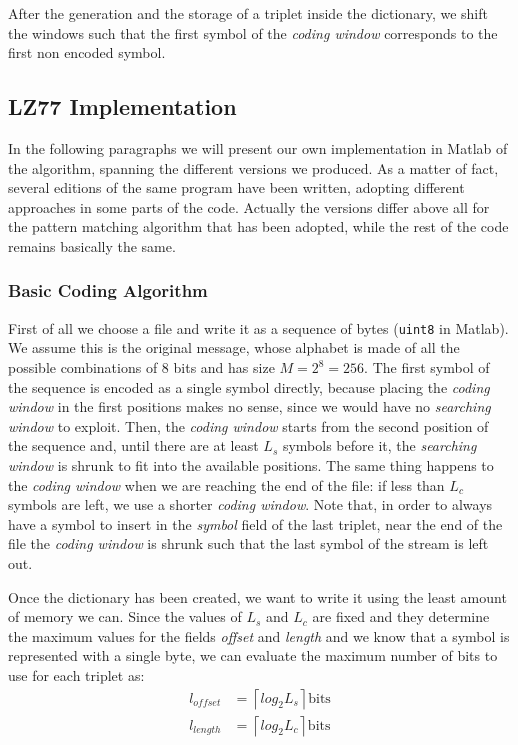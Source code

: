 After the generation and the storage of a triplet inside the dictionary, we shift the windows such that the first symbol of the \textit{coding window} corresponds to the first non encoded symbol.

\subsection{LZ77 Implementation} \label{subsec:lz77implem}
In the following paragraphs we will present our own implementation in Matlab of the algorithm, spanning the different versions we produced. As a matter of fact, several editions of the same program have been written, adopting different approaches in some parts of the code. Actually the versions differ above all for the pattern matching algorithm that has been adopted, while the rest of the code remains basically the same.

\subsubsection{Basic Coding Algorithm} \label{subsubsec:basiclz77}
First of all we choose a file and write it as a sequence of bytes (\texttt{uint8} in Matlab). We assume this is the original message, whose alphabet is made of all the possible combinations of $8$ bits and has size $M = 2^8 = 256$. The first symbol of the sequence is encoded as a single symbol directly, because placing the \textit{coding window} in the first positions makes no sense, since we would have no \textit{searching window} to exploit. Then, the \textit{coding window} starts from the second position of the sequence and, until there are at least $L_s$ symbols before it, the \textit{searching window} is shrunk to fit into the available positions. The same thing happens to the \textit{coding window} when we are reaching the end of the file: if less than $L_c$ symbols are left, we use a shorter \textit{coding window}. Note that, in order to always have a symbol to insert in the \textit{symbol} field of the last triplet, near the end of the file the \textit{coding window} is shrunk such that the last symbol of the stream is left out.

Once the dictionary has been created, we want to write it using the least amount of memory we can. Since the values of $L_s$ and $L_c$ are fixed and they determine the maximum values for the fields \textit{offset} and \textit{length} and we know that a symbol is represented with a single byte, we can evaluate the maximum number of bits to use for each triplet as:
\begin{align}
l_{offset} &= \left \lceil log_2L_s \right \rceil \text{bits} \\
l_{length} &= \left \lceil log_2L_c \right \rceil \text{bits} 
\end{align}

